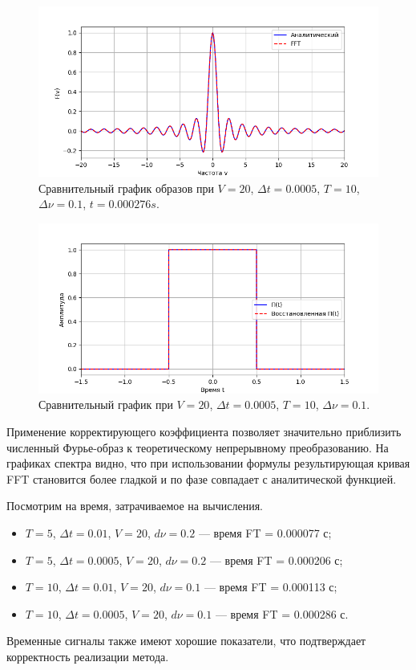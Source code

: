 \documentclass[a4paper]{article}
\begin{document}
\begin{figure}[H]
  \centering
  \includegraphics[width=\textwidth]{src/task_1_4/freq_10_0.0005_20_0.1.png}
  \caption{Сравнительный график образов при $V=20$, $\Delta t=0.0005$, $T=10$, $\Delta \nu=0.1$, $t=0.000276 s$.} 
\end{figure}
\begin{figure}[H]
  \centering
  \includegraphics[width=\textwidth]{src/task_1_4/time_10_0.0005_20_0.1.png}
  \caption{Сравнительный график при $V=20$, $\Delta t=0.0005$, $T=10$, $\Delta \nu=0.1$.} 
\end{figure}
\noindent Применение корректирующего коэффициента позволяет значительно приблизить численный Фурье-образ к теоретическому непрерывному преобразованию. На графиках спектра видно, что при использовании формулы результирующая кривая FFT становится более гладкой и по фазе совпадает с аналитической функцией.

Посмотрим на время, затрачиваемое на вычисления.
\begin{itemize}
  \item \(T=5\), \(\Delta t=0.01\), \(V=20\), \(d\nu=0.2\) --- время FT = 0.000077 с;
  \item \(T=5\), \(\Delta t=0.0005\), \(V=20\), \(d\nu=0.2\) --- время FT = 0.000206 с;
  \item \(T=10\), \(\Delta t=0.01\), \(V=20\), \(d\nu=0.1\) --- время FT = 0.000113 с;
  \item \(T=10\), \(\Delta t=0.0005\), \(V=20\), \(d\nu=0.1\) --- время FT = 0.000286 с.
\end{itemize}
Временные сигналы также имеют хорошие показатели, что подтверждает корректность реализации метода.
\end{document}
